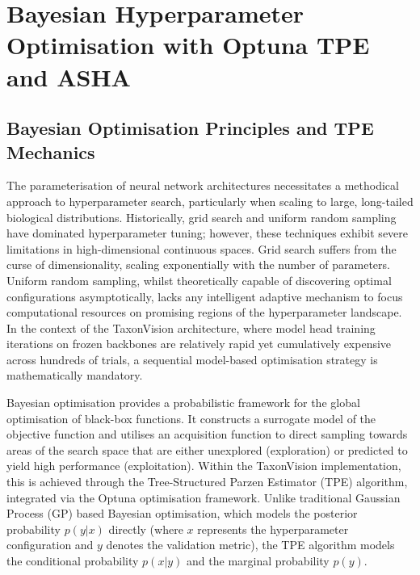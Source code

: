 \chapter{Bayesian Hyperparameter Optimisation with Optuna TPE and ASHA}
\label{ch:bayesian_hyperparameter_optimization}

\section{Bayesian Optimisation Principles and TPE Mechanics}
\label{sec:tpe_mechanics}

The parameterisation of neural network architectures necessitates a methodical approach to hyperparameter search, particularly when scaling to large, long-tailed biological distributions. Historically, grid search and uniform random sampling have dominated hyperparameter tuning; however, these techniques exhibit severe limitations in high-dimensional continuous spaces. Grid search suffers from the curse of dimensionality, scaling exponentially with the number of parameters. Uniform random sampling, whilst theoretically capable of discovering optimal configurations asymptotically, lacks any intelligent adaptive mechanism to focus computational resources on promising regions of the hyperparameter landscape. In the context of the TaxonVision architecture, where model head training iterations on frozen backbones are relatively rapid yet cumulatively expensive across hundreds of trials, a sequential model-based optimisation strategy is mathematically mandatory.

Bayesian optimisation provides a probabilistic framework for the global optimisation of black-box functions. It constructs a surrogate model of the objective function and utilises an acquisition function to direct sampling towards areas of the search space that are either unexplored (exploration) or predicted to yield high performance (exploitation). Within the TaxonVision implementation, this is achieved through the Tree-Structured Parzen Estimator (TPE) algorithm, integrated via the Optuna optimisation framework. Unlike traditional Gaussian Process (GP) based Bayesian optimisation, which models the posterior probability $p(y|x)$ directly (where $x$ represents the hyperparameter configuration and $y$ denotes the validation metric), the TPE algorithm models the conditional probability $p(x|y)$ and the marginal probability $p(y)$.

